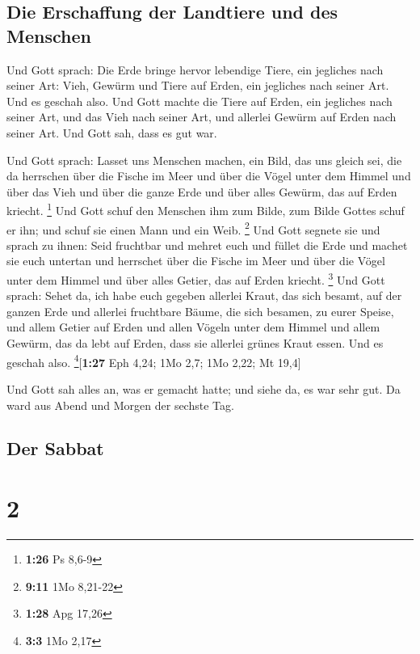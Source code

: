 \hypertarget{die-erschaffung-der-landtiere-und-des-menschen}{%
\subsection{Die Erschaffung der Landtiere und des
Menschen}\label{die-erschaffung-der-landtiere-und-des-menschen}}

 Und Gott sprach: Die Erde bringe hervor lebendige Tiere,
ein jegliches nach seiner Art: Vieh, Gewürm und Tiere auf Erden, ein
jegliches nach seiner Art. Und es geschah also.  Und Gott
machte die Tiere auf Erden, ein jegliches nach seiner Art, und das Vieh
nach seiner Art, und allerlei Gewürm auf Erden nach seiner Art. Und Gott
sah, dass es gut war.

 Und Gott sprach: Lasset uns Menschen machen, ein Bild,
das uns gleich sei, die da herrschen über die Fische im Meer und über
die Vögel unter dem Himmel und über das Vieh und über die ganze Erde und
über alles Gewürm, das auf Erden kriecht. \footnote{\textbf{1:26} Ps
  8,6-9}  Und Gott schuf den Menschen ihm zum Bilde, zum
Bilde Gottes schuf er ihn; und schuf sie einen Mann und ein Weib.
\footnote{\textbf{9:11} 1Mo 8,21-22}  Und Gott segnete
sie und sprach zu ihnen: Seid fruchtbar und mehret euch und füllet die
Erde und machet sie euch untertan und herrschet über die Fische im Meer
und über die Vögel unter dem Himmel und über alles Getier, das auf Erden
kriecht. \footnote{\textbf{1:28} Apg 17,26}  Und Gott
sprach: Sehet da, ich habe euch gegeben allerlei Kraut, das sich besamt,
auf der ganzen Erde und allerlei fruchtbare Bäume, die sich besamen, zu
eurer Speise,  und allem Getier auf Erden und allen
Vögeln unter dem Himmel und allem Gewürm, das da lebt auf Erden, dass
sie allerlei grünes Kraut essen. Und es geschah also.
\footnote{\textbf{3:3} 1Mo 2,17}{[}\textbf{1:27} Eph 4,24; 1Mo 2,7; 1Mo
2,22; Mt 19,4{]}

 Und Gott sah alles an, was er gemacht hatte; und siehe
da, es war sehr gut. Da ward aus Abend und Morgen der sechste Tag.

\hypertarget{der-sabbat}{%
\subsection{Der Sabbat}\label{der-sabbat}}

\hypertarget{section-1}{%
\section{2}\label{section-1}}

